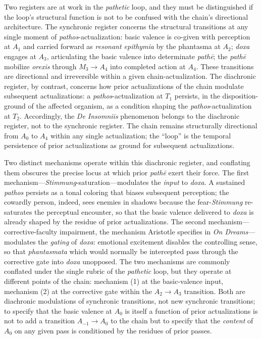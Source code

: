 \documentclass{article}
\begin{document}
Two registers are at work in the \textit{pathetic} loop, and they must be distinguished if the loop's structural function is not to be confused with the chain's directional architecture. The synchronic register concerns the structural transitions at any single moment of \textit{pathos}-actualization: basic valence is co-given with perception at $A_1$ and carried forward as \textit{resonant epithymia} by the phantasma at $A_2$; \textit{doxa} engages at $A_3$, articulating the basic valence into determinate \textit{path\=e}; the \textit{path\=e} mobilize \textit{orexis} through $M_3 \rightarrow A_4$ into completed action at $A_4$. These transitions are directional and irreversible within a given chain-actualization. The diachronic register, by contrast, concerns how prior actualizations of the chain modulate subsequent actualizations: a \textit{pathos}-actualization at $T_1$ persists, in the disposition-ground of the affected organism, as a condition shaping the \textit{pathos}-actualization at $T_2$. Accordingly, the \textit{De Insomniis} phenomenon belongs to the diachronic register, not to the synchronic register. The chain remains structurally directional from $A_0$ to $A_4$ within any single actualization; the ``loop'' is the temporal persistence of prior actualizations as ground for subsequent actualizations.

Two distinct mechanisms operate within this diachronic register, and conflating them obscures the precise locus at which prior \textit{path\=e} exert their force. The first mechanism---\textit{Stimmung}-saturation---modulates the \textit{input} to \textit{doxa}. A sustained \textit{pathos} persists as a tonal coloring that biases subsequent perception; the cowardly person, indeed, sees enemies in shadows because the fear-\textit{Stimmung} re-saturates the perceptual encounter, so that the basic valence delivered to \textit{doxa} is already shaped by the residue of prior actualizations. The second mechanism---corrective-faculty impairment, the mechanism Aristotle specifies in \textit{On Dreams}---modulates the \textit{gating} of \textit{doxa}: emotional excitement disables the controlling sense, so that \textit{phantasmata} which would normally be intercepted pass through the corrective gate into \textit{doxa} unopposed. The two mechanisms are commonly conflated under the single rubric of the \textit{pathetic} loop, but they operate at different points of the chain: mechanism (1) at the basic-valence input, mechanism (2) at the corrective gate within the $A_2 \rightarrow A_3$ transition. Both are diachronic modulations of synchronic transitions, not new synchronic transitions; to specify that the basic valence at $A_0$ is itself a function of prior actualizations is not to add a transition $A_{-1} \rightarrow A_0$ to the chain but to specify that the \textit{content} of $A_0$ on any given pass is conditioned by the residues of prior passes.
\end{document}
